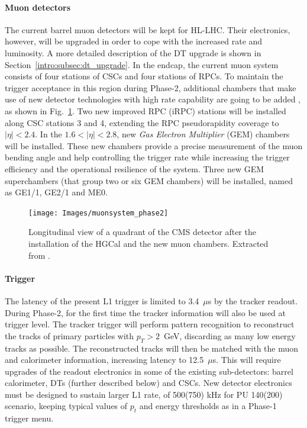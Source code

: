 \documentclass[../main.tex]{subfiles}
\begin{document}
\paragraph{Muon detectors}

The current barrel muon detectors will be kept for HL-LHC. Their electronics, however, will be upgraded in order to cope with the increased rate and luminosity. A more detailed description of the DT upgrade is shown in Section~\ref{intro:subsec:dt_upgrade}. In the endcap, the current muon system consists of four stations of CSCs and four stations of RPCs. To maintain the trigger acceptance in this region during Phase-2, additional chambers that make use of new detector technologies with high rate capability are going to be added \cite{muontdr}, as shown in Fig.~\ref{intro:fig:muon_phase2}. Two new improved RPC (iRPC) stations will be installed along CSC stations 3 and 4, extending the RPC pseudorapidity coverage to $|\eta|<2.4$. In the $1.6<|\eta|<2.8$, new \textit{Gas Electron Multiplier} (GEM) chambers will be installed. These new chambers provide a precise measurement of the muon bending angle and help controlling the trigger rate while increasing the trigger efficiency and the operational resilience of the system. Three new GEM superchambers (that group two or six GEM chambers) will be installed, named as GE1/1, GE2/1 and ME0.

\begin{figure}[h!]
\begin{center}
\texttt{[image: Images/muonsystem\_phase2]}
\end{center}
\caption[CMS structure after the Phase-2 upgrade]{Longitudinal view of a quadrant of the CMS detector after the installation of the HGCal and the new muon chambers. Extracted from \cite{l1tdr}.}
\label{intro:fig:muon_phase2}
\end{figure}


\paragraph{Trigger}

The latency of the present L1 trigger is limited to 3.4~$\mu$s by the tracker readout. During Phase-2, for the first time the tracker information will also be used at trigger level. The tracker trigger will perform pattern recognition to reconstruct the tracks of primary particles with $p_T > 2$~GeV, discarding as many low energy tracks as possible. The reconstructed tracks will then be matched with the muon and calorimeter information, increasing latency to 12.5~$\mu$s. This will require upgrades of the readout electronics in some of the existing sub-detectors: barrel calorimeter, DTs (further described below) and CSCs. New detector electronics must be designed to sustain larger L1 rate, of 500(750) kHz for PU 140(200) scenario, keeping typical values of $p_t$ and energy thresholds as in a Phase-1 trigger menu.
\end{document}

